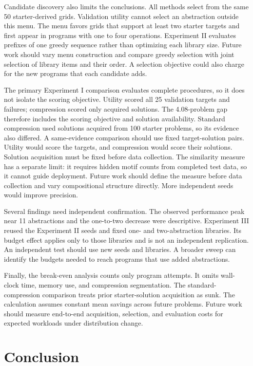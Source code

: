 \documentclass[10pt]{article}
\begin{document}
Candidate discovery also limits the conclusions. All methods select from the
same 50 starter-derived grids. Validation utility cannot select an abstraction
outside this menu. The menu favors grids
that support at least two starter targets and first appear in programs with one
to four operations. Experiment II evaluates prefixes of one greedy sequence
rather than optimizing each library size. Future work should vary menu
construction and compare greedy selection with joint selection of library items
and their order. A selection objective could also charge for the new programs
that each candidate adds.

The primary Experiment I comparison evaluates complete procedures, so it does
not isolate the scoring objective. Utility scored all 25 validation targets and
failures; compression scored only acquired solutions. The 4.08-problem gap
therefore includes the scoring objective and
solution availability. Standard compression used solutions acquired from 100
starter problems, so its evidence also differed. A same-evidence comparison
should use fixed target-solution pairs. Utility would score the targets, and
compression would score their solutions. Solution acquisition must be fixed
before data collection. The similarity measure has a separate limit: it
requires hidden motif counts from completed test data, so it cannot guide
deployment. Future work should define the measure before data collection and
vary compositional structure directly. More
independent seeds would improve precision.

Several findings need independent confirmation. The observed performance peak
near 11 abstractions and the one-to-two decrease were descriptive.
Experiment III reused the Experiment II seeds and fixed one- and
two-abstraction libraries. Its budget effect applies only to those libraries
and is not an independent replication. An independent test should use new seeds
and libraries. A broader sweep can identify the budgets needed to reach
programs that use added abstractions.

Finally, the break-even analysis counts only program attempts. It omits
wall-clock time, memory use, and compression segmentation. The
standard-compression comparison treats prior starter-solution acquisition as
sunk. The calculation assumes constant mean savings across future problems.
Future work should measure end-to-end acquisition, selection, and evaluation
costs for expected workloads under distribution change.

\newpage
\section{Conclusion}
\end{document}
